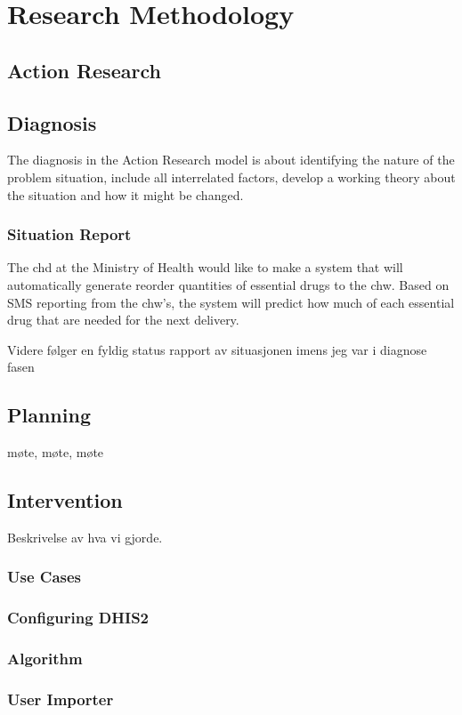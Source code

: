 \chapter{Research Methodology}
\section{Action Research}	
\cite{car:rmn}
\cite{bjo:risc}
\section{Diagnosis}
The diagnosis in the Action Research model is about identifying the nature of the problem situation, include all interrelated factors, develop a working theory about the situation and how it might be changed.  
\subsection{Situation Report}
The \gls{chd} at the Ministry of Health would like to make a system that will automatically generate reorder quantities of essential drugs to the \gls{chw}.
Based on SMS reporting from the \gls{chw}'s, the system will predict how much of each essential drug that are needed for the next delivery.

\Large{Videre følger en fyldig status rapport av situasjonen imens jeg var i diagnose fasen}

\section{Planning}
møte, møte, møte

\section{Intervention}
Beskrivelse av hva vi gjorde.
\subsection{Use Cases}
\subsection{Configuring DHIS2}
\subsection{Algorithm}
\subsection{User Importer}
